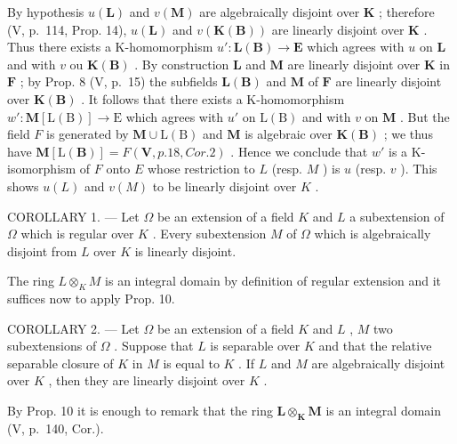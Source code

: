 By hypothesis \(u(\mathbf{L})\) and \(v(\mathbf{M})\) are algebraically disjoint over \(\mathbf{K}\) ; therefore (V, p.~114, Prop. 14), \(u(\mathbf{L})\) and \(v(\mathbf{K}(\mathbf{B}))\) are linearly disjoint over \(\mathbf{K}\) . Thus there exists a K-homomorphism \(u': \mathbf{L}(\mathbf{B}) \to \mathbf{E}\) which agrees with \(u\) on \(\mathbf{L}\) and with \(v\) ou \(\mathbf{K}(\mathbf{B})\) . By construction \(\mathbf{L}\) and \(\mathbf{M}\) are linearly disjoint over \(\mathbf{K}\) in \(\mathbf{F}\) ; by Prop. 8 (V, p.~15) the subfields \(\mathbf{L}(\mathbf{B})\) and \(\mathbf{M}\) of \(\mathbf{F}\) are linearly disjoint over \(\mathbf{K}(\mathbf{B})\) . It follows that there exists a K-homomorphism \(w' \colon \mathbf{M}[\mathrm{L}(\mathrm{B})] \to \mathrm{E}\) which agrees with \(u'\) on \(\mathrm{L}(\mathrm{B})\) and with \(v\) on \(\mathbf{M}\) . But the field \(F\) is generated by \(\mathbf{M} \cup \mathrm{L}(\mathrm{B})\) and \(\mathbf{M}\) is algebraic over \(\mathbf{K}(\mathbf{B})\) ; we thus have \(\mathbf{M}[\mathrm{L}(\mathbf{B})] = F(\mathbf{V}, p. 18, Cor. 2)\) . Hence we conclude that \(w'\) is a K-isomorphism of \(F\) onto \(E\) whose restriction to \(L\) (resp. \(M\) ) is \(u\) (resp. \(v\) ). This shows \(u(L)\) and \(v(M)\) to be linearly disjoint over \(K\) .

COROLLARY 1. --- Let \(\Omega\) be an extension of a field \(K\) and \(L\) a subextension of \(\Omega\) which is regular over \(K\) . Every subextension \(M\) of \(\Omega\) which is algebraically disjoint from \(L\) over \(K\) is linearly disjoint.

The ring \(L \otimes_{K} M\) is an integral domain by definition of regular extension and it suffices now to apply Prop. 10.

COROLLARY 2. --- Let \(\Omega\) be an extension of a field \(K\) and \(L\) , \(M\) two subextensions of \(\Omega\) . Suppose that \(L\) is separable over \(K\) and that the relative separable closure of \(K\) in \(M\) is equal to \(K\) . If \(L\) and \(M\) are algebraically disjoint over \(K\) , then they are linearly disjoint over \(K\) .

By Prop. 10 it is enough to remark that the ring \(\mathbf{L} \otimes_{\mathbf{K}} \mathbf{M}\) is an integral domain (V, p.~140, Cor.).

\BourbakiExercises

\BourbakiExerciseGroup

